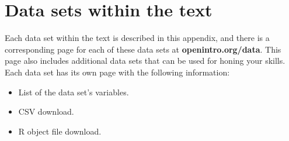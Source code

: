 \chapter{Data sets within the text}
\label{appendix_data}
\label{data_appendix}



Each data set within the text is described in this appendix,
and there is a corresponding page for each of these data sets at
    {\color{black}\textbf{openintro.org/data}}.
This page also includes additional data sets that can be
used for honing your skills.
Each data set has its own page with the following information:
\begin{itemize}
\setlength{\itemsep}{0mm}
\item
    List of the data set's variables.
\item
    CSV download.
\item
    R object file download.
\end{itemize}


\newcommand{\datawrap}[1]{#1 $\to$}
\newcommand{\seedataappendix}[1]{This data set
    is described in Data Appendix~\ref{#1}.}
\newcommand{\seedataappendixplural}[1]{These data sets
    are described in Data Appendix~\ref{#1}.}
\newcommand{\madeup}{This example was made up.}



\section{}
\label{ch_intro_to_data_data}


